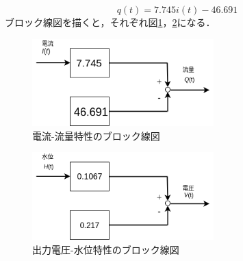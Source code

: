 \documentclass[12pt]{jsarticle}
\begin{document}
\begin{equation}
  q(t) = 7.745i(t) - 46.691
\end{equation}
ブロック線図を描くと，それぞれ図\ref{BlockDiagIQ}，\ref{BlockDiagVH}になる．
\begin{figure}[p]
  \begin{center}
    \includegraphics[clip,width=7.0cm]{../img/BlockDiagIQ.png}
    \caption{電流-流量特性のブロック線図}
    \label{BlockDiagIQ}
  \end{center}
\end{figure}
\begin{figure}[p]
  \begin{center}
    \includegraphics[clip,width=7.0cm]{../img/BlockDiagHV.png}
    \caption{出力電圧-水位特性のブロック線図}
    \label{BlockDiagVH}
  \end{center}
\end{figure}
\end{document}
